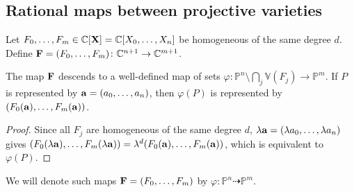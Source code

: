 \subsection{Rational maps between projective varieties}
Let \( F_0, \dots, F_m \in \mathbb C[\vb X] = \mathbb C[X_0, \dots, X_n] \) be homogeneous of the same degree \( d \).
Define \( \vb F = (F_0, \dots, F_m) \colon \mathbb C^{n+1} \to \mathbb C^{m+1} \).
\begin{proposition}
    The map \( \vb F \) descends to a well-defined map of sets \( \varphi \colon \mathbb P^n \setminus \bigcap_j \mathbb V(F_j) \to \mathbb P^m \).
    If \( P \) is represented by \( \vb a = (a_0, \dots, a_n) \), then \( \varphi(P) \) is represented by \( (F_0(\vb a), \dots, F_m(\vb a)) \).
\end{proposition}
\begin{proof}
    Since all \( F_j \) are homogeneous of the same degree \( d \), \( \lambda \vb a = (\lambda a_0, \dots, \lambda a_n) \) gives \( (F_0(\lambda\vb a), \dots, F_m(\lambda \vb a)) = \lambda^d (F_0(\vb a), \dots, F_m(\vb a)) \), which is equivalent to \( \varphi(P) \).
\end{proof}
We will denote such maps \( \vb F = (F_0, \dots, F_m) \) by \( \varphi \colon \mathbb P^n \dashrightarrow \mathbb P^m \).

